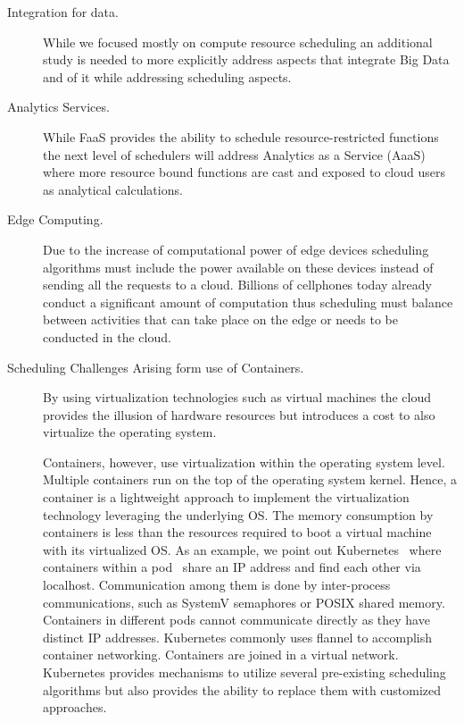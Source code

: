 \documentclass[final,5p,times,twocolumn]{elsarticle}
\begin{document}
\begin{description}

\item[Integration for data.] While we focused mostly on compute resource scheduling an additional study is needed to more explicitly address aspects that integrate Big Data and of it while addressing scheduling aspects.

\item[Analytics Services.] While FaaS provides the ability to schedule resource-restricted functions the next level of schedulers will address Analytics as a Service (AaaS) where more resource bound functions are cast and exposed to cloud users as analytical calculations.
 
\item[Edge Computing.] Due to the increase of computational power of edge devices scheduling algorithms must include the power available on these devices instead of sending all the requests to a cloud. Billions of cellphones today already conduct a significant amount of computation thus scheduling must balance between activities that can take place on the edge or needs to be conducted in the cloud.

\item[Scheduling Challenges Arising form use of Containers.] By using virtualization technologies such as virtual machines the cloud provides the illusion of hardware resources but introduces a cost to also virtualize the operating system.

 Containers, however, use virtualization within the operating system level. Multiple containers run on the top of the operating system kernel. Hence, a container is a lightweight approach to implement the virtualization technology leveraging the underlying OS. The memory consumption by containers is less than the resources required to boot a virtual machine with its virtualized OS. As an example, we point out Kubernetes~\cite{Kuber2018} where containers within a pod~\cite{Kubernates2018} share an IP address and find each other via localhost. Communication among them is done by inter-process communications, such as SystemV semaphores or POSIX shared memory. Containers in different pods cannot communicate directly as they have distinct IP addresses. Kubernetes commonly uses flannel to accomplish container networking. Containers are joined in a virtual network. Kubernetes provides mechanisms to utilize several pre-existing scheduling algorithms but also provides the ability to replace them with customized approaches.


\end{description}
\end{document}
